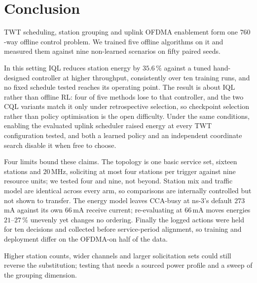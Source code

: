 \section{Conclusion}
\label{sec:conclusion}

TWT scheduling, station grouping and uplink OFDMA enablement form one $760$-way
offline control problem. We trained five offline algorithms on it and measured
them against nine non-learned scenarios on fifty paired seeds.

In this setting IQL reduces station energy by $35.6\,\%$ against a tuned
hand-designed controller at higher throughput, consistently over ten training
runs, and no fixed schedule tested reaches its operating point. The
result is about IQL rather than offline RL: four of five methods lose to that
controller, and the two CQL variants match it only under retrospective
selection, so checkpoint selection rather than policy optimisation is the open
difficulty.
Under the same conditions, enabling the evaluated uplink scheduler raised
energy at every TWT configuration tested, and both a learned policy and an
independent coordinate search disable it when free to choose.

Four limits bound these claims. The topology is one basic service set, sixteen
stations and $20$\,MHz, soliciting at most four stations per trigger against
nine resource units; we tested four and nine, not beyond. Station mix and
traffic model are identical across every arm, so comparisons are internally
controlled but not shown to transfer. The energy model leaves CCA-busy at ns-3's
default $273$\,mA against its own $66$\,mA receive current; re-evaluating at
$66$\,mA moves energies $21$--$27\,\%$ unevenly yet changes no ordering.
Finally the logged actions were held for ten decisions and collected before
service-period alignment, so training and deployment differ on the OFDMA-on
half of the data.

Higher station counts, wider channels and larger solicitation sets could still
reverse the substitution; testing that needs a sourced power profile and a
sweep of the grouping dimension.
